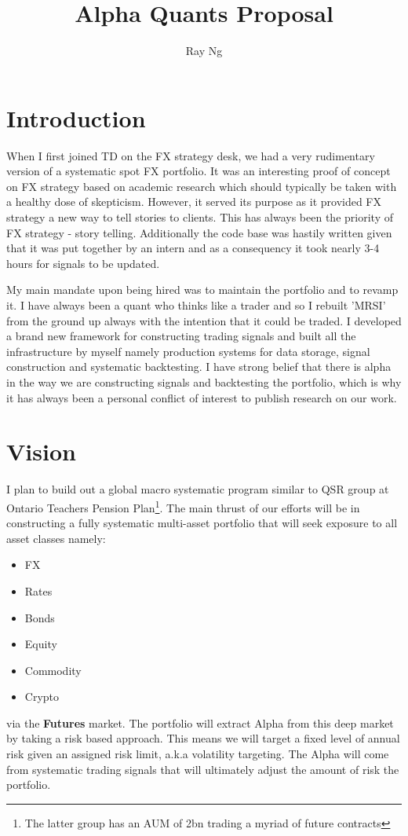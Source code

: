 \documentclass{article}
\title{Alpha Quants Proposal}
\author{Ray Ng}
\begin{document}
\maketitle
\tableofcontents


\section{Introduction}
When I first joined TD on the FX strategy desk, we had a very rudimentary version of a systematic spot FX portfolio. It was an interesting proof of concept on FX strategy based on academic research which should typically be taken with a healthy dose of skepticism. However, it served its purpose as it provided FX strategy a new way to tell stories to clients. This has always been the priority of FX strategy - story telling. Additionally the code base was hastily written given that it was put together by an intern and as a consequency it took nearly 3-4 hours for signals to be updated. 

My main mandate upon being hired was to maintain the portfolio and to revamp it. I have always been a quant who thinks like a trader and so I rebuilt 'MRSI' from the ground up always with the intention that it could be traded. I developed a brand new framework for constructing trading signals and built all the infrastructure by myself namely production systems for data storage, signal construction and systematic backtesting. I have strong belief that there is alpha in the way we are constructing signals and backtesting the portfolio, which is why it has always been a personal conflict of interest to publish research on our work. 

\section{Vision}
I plan to build out a global macro systematic program similar to QSR group at Ontario Teachers Pension Plan\footnote{The latter group has an AUM of 2bn trading a myriad of future contracts}. The main thrust of our efforts will be in constructing a fully systematic multi-asset portfolio that will seek exposure to all asset classes namely: 
\begin{itemize}
\item FX
\item Rates
\item Bonds
\item Equity
\item Commodity 
\item Crypto
\end{itemize}
via the \textbf{Futures} market. The portfolio will extract Alpha from this deep market by taking a risk based approach. This means we will target a fixed level of annual risk given an assigned risk limit, a.k.a volatility targeting. The Alpha will come from systematic trading signals that will ultimately adjust the amount of risk the portfolio.
\end{document}
